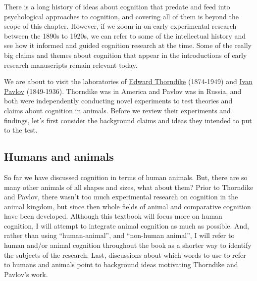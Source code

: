 \documentclass[
  oneside,
  12pt]{crumpbook}
\begin{document}
There is a long history of ideas about cognition that predate and feed into psychological approaches to cognition, and covering all of them is beyond the scope of this chapter. However, if we zoom in on early experimental research between the 1890s to 1920s, we can refer to some of the intellectual history and see how it informed and guided cognition research at the time. Some of the really big claims and themes about cognition that appear in the introductions of early research manuscripts remain relevant today.

We are about to visit the laboratories of \href{https://en.wikipedia.org/wiki/Edward_Thorndike}{Edward Thorndike} (1874-1949) and \href{https://en.wikipedia.org/wiki/Ivan_Pavlov}{Ivan Pavlov} (1849-1936). Thorndike was in America and Pavlov was in Russia, and both were independently conducting novel experiments to test theories and claims about cognition in animals. Before we review their experiments and findings, let's first consider the background claims and ideas they intended to put to the test.

\hypertarget{humans-and-animals}{%
\subsection{Humans and animals}\label{humans-and-animals}}

So far we have discussed cognition in terms of human animals. But, there are so many other animals of all shapes and sizes, what about them? Prior to Thorndike and Pavlov, there wasn't too much experimental research on cognition in the animal kingdom, but since then whole fields of animal and comparative cognition have been developed. Although this textbook will focus more on human cognition, I will attempt to integrate animal cognition as much as possible. And, rather than using ``human-animal'', and ``non-human animal'', I will refer to human and/or animal cognition throughout the book as a shorter way to identify the subjects of the research. Last, discussions about which words to use to refer to humans and animals point to background ideas motivating Thorndike and Pavlov's work.
\end{document}
